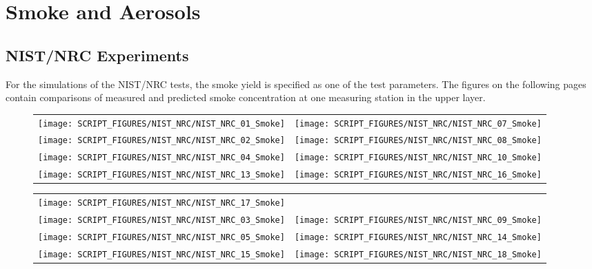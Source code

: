 \clearpage


\section{Smoke and Aerosols}



\subsection{NIST/NRC Experiments}

For the simulations of the NIST/NRC tests, the smoke yield is specified as one of the test parameters.
The figures on the following pages contain comparisons of measured and predicted smoke concentration at one measuring station in the upper layer.

\begin{figure}[p]
\begin{tabular*}{\textwidth}{l@{\extracolsep{\fill}}r}
\texttt{[image: SCRIPT\_FIGURES/NIST\_NRC/NIST\_NRC\_01\_Smoke]} &
\texttt{[image: SCRIPT\_FIGURES/NIST\_NRC/NIST\_NRC\_07\_Smoke]} \\
\texttt{[image: SCRIPT\_FIGURES/NIST\_NRC/NIST\_NRC\_02\_Smoke]} &
\texttt{[image: SCRIPT\_FIGURES/NIST\_NRC/NIST\_NRC\_08\_Smoke]} \\
\texttt{[image: SCRIPT\_FIGURES/NIST\_NRC/NIST\_NRC\_04\_Smoke]} &
\texttt{[image: SCRIPT\_FIGURES/NIST\_NRC/NIST\_NRC\_10\_Smoke]} \\
\texttt{[image: SCRIPT\_FIGURES/NIST\_NRC/NIST\_NRC\_13\_Smoke]} &
\texttt{[image: SCRIPT\_FIGURES/NIST\_NRC/NIST\_NRC\_16\_Smoke]}
\end{tabular*}
\end{figure}

\begin{figure}[p]
\begin{tabular*}{\textwidth}{l@{\extracolsep{\fill}}r}
\texttt{[image: SCRIPT\_FIGURES/NIST\_NRC/NIST\_NRC\_17\_Smoke]} &
 \\
\texttt{[image: SCRIPT\_FIGURES/NIST\_NRC/NIST\_NRC\_03\_Smoke]} &
\texttt{[image: SCRIPT\_FIGURES/NIST\_NRC/NIST\_NRC\_09\_Smoke]} \\
\texttt{[image: SCRIPT\_FIGURES/NIST\_NRC/NIST\_NRC\_05\_Smoke]} &
\texttt{[image: SCRIPT\_FIGURES/NIST\_NRC/NIST\_NRC\_14\_Smoke]} \\
\texttt{[image: SCRIPT\_FIGURES/NIST\_NRC/NIST\_NRC\_15\_Smoke]} &
\texttt{[image: SCRIPT\_FIGURES/NIST\_NRC/NIST\_NRC\_18\_Smoke]}
\end{tabular*}
\end{figure}


